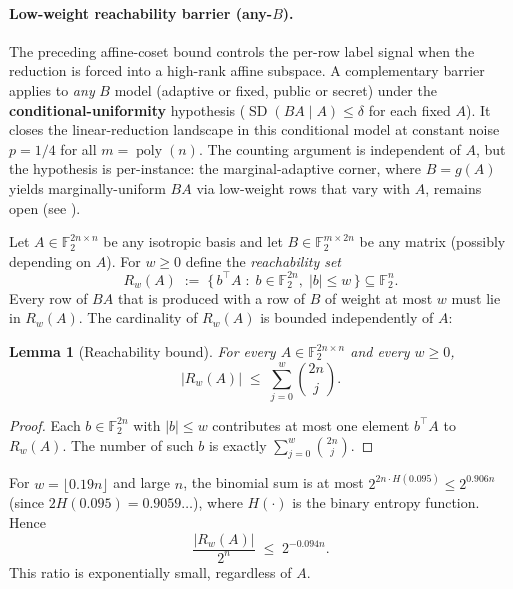 \documentclass[11pt,a4paper]{article}
\theoremstyle{plain}
\newtheorem{lemma}[theorem]{Lemma}
\theoremstyle{definition}
\newcommand{\F}{\mathbb{F}}
\begin{document}
\paragraph{Low-weight reachability barrier (any-$B$).}
The preceding affine-coset bound controls the per-row label signal when the reduction is forced into a high-rank affine subspace.  A complementary barrier applies to \emph{any} $B$ model (adaptive or fixed, public or secret) under the \textbf{conditional-uniformity} hypothesis ($\operatorname{SD}(BA\mid A)\le\delta$ for each fixed $A$).  It closes the linear-reduction landscape in this conditional model at constant noise $p=1/4$ for all $m=\operatorname{poly}(n)$.  The counting argument is independent of $A$, but the hypothesis is per-instance: the marginal-adaptive corner, where $B=g(A)$ yields marginally-uniform $BA$ via low-weight rows that vary with $A$, remains open (see ).

Let $A\in\F_2^{2n\times n}$ be any isotropic basis and let $B\in\F_2^{m\times 2n}$ be any matrix (possibly depending on $A$).  For $w\ge 0$ define the \emph{reachability set}
\[
R_w(A) \;:=\; \{\,b^{\!\top} A \;:\; b\in\F_2^{2n},\; |b|\le w \,\} \subseteq \F_2^{n}.
\]
Every row of $BA$ that is produced with a row of $B$ of weight at most $w$ must lie in $R_w(A)$.  The cardinality of $R_w(A)$ is bounded independently of $A$:

\begin{lemma}[Reachability bound]
\label{lem:reachability}
For every $A\in\F_2^{2n\times n}$ and every $w\ge 0$,
\[
|R_w(A)| \;\le\; \sum_{j=0}^{w} \binom{2n}{j}.
\]
\end{lemma}

\begin{proof}
Each $b\in\F_2^{2n}$ with $|b|\le w$ contributes at most one element $b^{\!\top}A$ to $R_w(A)$.  The number of such $b$ is exactly $\sum_{j=0}^{w}\binom{2n}{j}$.
\end{proof}

For $w=\lfloor 0.19n\rfloor$ and large $n$, the binomial sum is at most $2^{2n\cdot H(0.095)}\le 2^{0.906n}$ (since $2H(0.095)=0.9059\ldots$), where $H(\cdot)$ is the binary entropy function.  Hence
\begin{equation}
\label{eq:reach-mass}
\frac{|R_w(A)|}{2^{n}} \;\le\; 2^{-0.094n}.
\end{equation}
This ratio is exponentially small, regardless of $A$.
\end{document}
